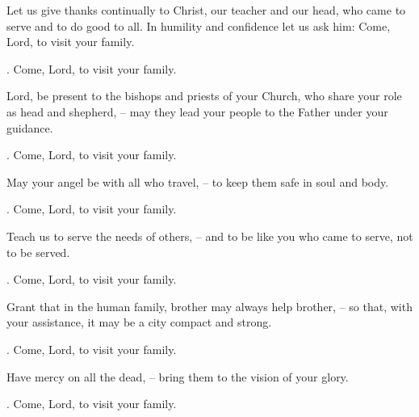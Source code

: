 \lettrine[lines=2]{L}{}et us give thanks continually to Christ, our teacher and our head, who came to serve and to do good to all. In humility and confidence let us ask him: Come, Lord, to visit your family.
\par \Rbar. Come, Lord, to visit your family.

Lord, be present to the bishops and priests of your Church, who share your role as head and shepherd,
– may they lead your people to the Father under your guidance.
\par \Rbar. Come, Lord, to visit your family.

May your angel be with all who travel,
– to keep them safe in soul and body.
\par \Rbar. Come, Lord, to visit your family.

Teach us to serve the needs of others,
– and to be like you who came to serve, not to be served.
\par \Rbar. Come, Lord, to visit your family.

Grant that in the human family, brother may always help brother,
– so that, with your assistance, it may be a city compact and strong.
\par \Rbar. Come, Lord, to visit your family.

Have mercy on all the dead,
– bring them to the vision of your glory.
\par \Rbar. Come, Lord, to visit your family.
